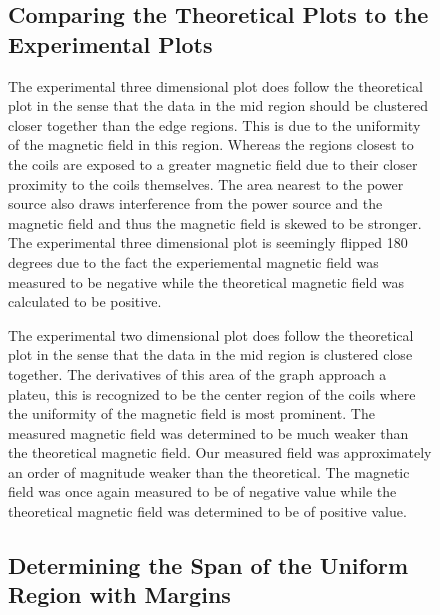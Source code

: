 \documentclass[a4paper]{article}
\begin{document}
\begin{figure}
\subsection{Comparing the Theoretical Plots to the Experimental Plots}
The experimental three dimensional plot does follow the theoretical
plot in the sense that the data in the mid region should be clustered
closer together than the edge regions. This is due to the uniformity
of the magnetic field in this region. Whereas the regions closest to
the coils are exposed to a greater magnetic field due to their closer
proximity to the coils themselves. The area nearest to the power
source also draws interference from the power source and the magnetic
field and thus the magnetic field is skewed to be stronger. The
experimental three dimensional plot is seemingly flipped 180 degrees
due to the fact the experiemental magnetic field was measured to be
negative while the theoretical magnetic field was calculated to be
positive.

The experimental two dimensional plot does follow the theoretical plot
in the sense that the data in the mid region is clustered close
together. The derivatives of this area of the graph approach a
plateu, this is recognized to be the center region of the coils where
the uniformity of the magnetic field is most prominent. The measured
magnetic field was determined to be much weaker than the theoretical
magnetic field. Our measured field was approximately an order of
magnitude weaker than the theoretical. The magnetic field was once
again measured to be of negative value while the theoretical magnetic
field was determined to be of positive value.

\subsection{Determining the Span of the Uniform Region with Margins}

\end{figure}
\end{document}
